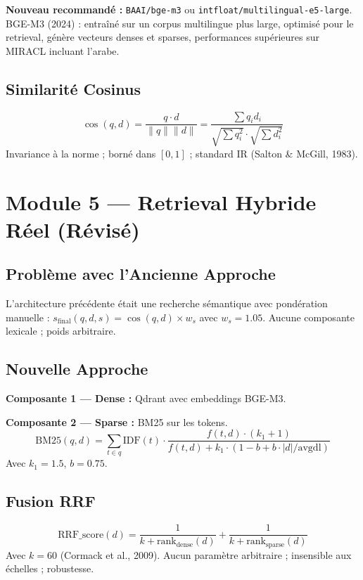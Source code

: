 \documentclass[11pt,a4paper]{article}
\begin{document}
\textbf{Nouveau recommandé :} \texttt{BAAI/bge-m3} ou \texttt{intfloat/multilingual-e5-large}. BGE-M3 (2024) : entraîné sur un corpus multilingue plus large, optimisé pour le retrieval, génère vecteurs denses et sparses, performances supérieures sur MIRACL incluant l'arabe.

\subsection{Similarité Cosinus}

\begin{equation}
\cos(q, d) = \frac{q \cdot d}{\|q\| \|d\|} = \frac{\sum q_i d_i}{\sqrt{\sum q_i^2} \cdot \sqrt{\sum d_i^2}}
\end{equation}
Invariance à la norme ; borné dans $[0,1]$ ; standard IR (Salton \& McGill, 1983).

\section{Module 5 --- Retrieval Hybride Réel (Révisé)}

\subsection{Problème avec l'Ancienne Approche}

L'architecture précédente était une recherche sémantique avec pondération manuelle : $s_{\text{final}}(q,d,s) = \cos(q,d) \times w_s$ avec $w_s = 1.05$. Aucune composante lexicale ; poids arbitraire.

\subsection{Nouvelle Approche}

\textbf{Composante 1 --- Dense :} Qdrant avec embeddings BGE-M3.

\textbf{Composante 2 --- Sparse :} BM25 sur les tokens.
\begin{equation}
\text{BM25}(q,d) = \sum_{t \in q} \text{IDF}(t) \cdot \frac{f(t,d) \cdot (k_1+1)}{f(t,d) + k_1 \cdot (1 - b + b \cdot |d|/\text{avgdl})}
\end{equation}
Avec $k_1 = 1.5$, $b = 0.75$.

\subsection{Fusion RRF}

\begin{equation}
\text{RRF\_score}(d) = \frac{1}{k + \text{rank}_{\text{dense}}(d)} + \frac{1}{k + \text{rank}_{\text{sparse}}(d)}
\end{equation}
Avec $k = 60$ (Cormack et al., 2009). Aucun paramètre arbitraire ; insensible aux échelles ; robustesse.
\end{document}
